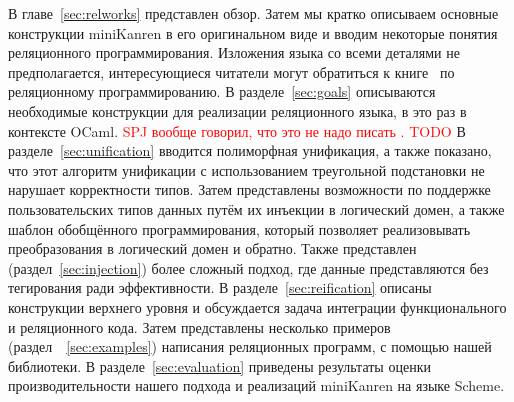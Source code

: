 В главе~\ref{sec:relworks} представлен обзор.
Затем мы кратко описываем основные конструкции miniKanren в его оригинальном виде и вводим некоторые понятия реляционного программирования. Изложения языка со всеми деталями не предполагается, интересующиеся читатели могут обратиться к книге~\cite{TRS} по реляционному программированию.
В разделе~\ref{sec:goals} описываются необходимые конструкции для реализации реляционного языка, в это раз в контексте OCaml.
\textcolor{red}{SPJ вообще говорил, что это не надо писать . TODO}
В разделе~\ref{sec:unification} вводится полиморфная унификация,  а также показано, что этот алгоритм унификации с использованием треугольной подстановки не нарушает корректности типов.
Затем представлены возможности по поддержке пользовательских типов данных путём их инъекции в логический домен, а также шаблон обобщённого программирования, который позволяет реализовывать преобразования в логический домен и обратно.
Также представлен (раздел~\ref{sec:injection}) более сложный подход, где данные представляются без тегирования ради эффективности.
В разделе~\ref{sec:reification} описаны конструкции верхнего уровня и обсуждается задача интеграции функционального и реляционного кода.
Затем представлены несколько примеров (раздел~~\ref{sec:examples}) написания реляционных программ, с помощью нашей библиотеки.
В разделе~\ref{sec:evaluation} приведены результаты оценки производительности нашего подхода и реализаций miniKanren на языке Scheme.



